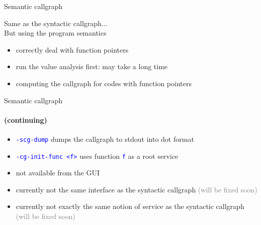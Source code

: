 \documentclass{beamer}
\newcommand{\orange}[1]{{\textcolor{frama-c-1}{#1}}}
\newcommand{\vvert}[1]{{\textcolor{vert}{#1}}}
\newcommand{\bleu}[1]{{\textcolor{blue}{#1}}}
\newcommand{\gris}[1]{{\textcolor{gray}{#1}}}
\newcommand{\code}[1]{\bleu{\texttt{#1}}}
\newcommand{\comment}[1]{\gris{(#1)}}
\newcommand{\continuing}{\framesubtitle{(continuing)}}
\newcommand{\intro}[1]{\begin{center}\vvert{#1}\end{center}}
\newenvironment{sect}[1]{\orange{#1}\begin{itemize}}{\end{itemize}}
\newenvironment{features}{\begin{sect}{Features}}{\end{sect}}
\newenvironment{warnings}{\begin{sect}{Warnings}}{\end{sect}}
\newenvironment{whatitisgoodfor}{\begin{sect}{What is it good for}}{\end{sect}}
\newenvironment{howtouse}{\begin{sect}{How to use}}{\end{sect}}
\begin{document}
\begin{frame}{Semantic callgraph}


  \intro{Same as the syntactic callgraph... \\
    But using the program semantics}

\begin{features}
\item correctly deal with function pointers
\end{features}\medskip

\begin{warnings}
\item run the value analysis first: may take a long time
\end{warnings}\medskip

\begin{whatitisgoodfor}
\item computing the callgraph for codes with function pointers
\end{whatitisgoodfor}
\end{frame}


\begin{frame}{Semantic callgraph}
\continuing

\begin{howtouse}
\item \code{-scg-dump} dumps the callgraph to stdout into dot format
\item \code{-cg-init-func <f>} uses function \code{f} as a root service
\item not available from the GUI
\end{howtouse}\medskip

\begin{warnings}
\item currently not the same interface as the syntactic callgraph
  \comment{will be fixed soon}
\item currently not exactly the same notion of service as the syntactic
  callgraph \comment{will be fixed soon}
\end{warnings}


\end{frame}

\end{document}
